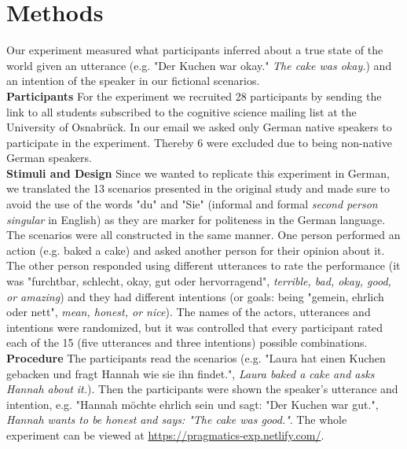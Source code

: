 \documentclass[a4paper,11pt]{article}
\begin{document}
\section{Methods}
Our experiment measured what participants inferred about a true state of the world given an utterance (e.g. "Der Kuchen war okay." \textit{The cake was okay.}) and an intention of the speaker in our fictional scenarios. \\
\textbf{Participants} For the experiment we recruited 28 participants by sending the link to all students subscribed to the cognitive science mailing list at the University of Osnabrück. In our email we asked only German native speakers to participate in the experiment. Thereby 6 were excluded due to being non-native German speakers.\\
\textbf{Stimuli and Design} Since we wanted to replicate this experiment in German, we translated the 13 scenarios presented in the original study and made sure to avoid the use of the words "du" and "Sie" (informal and formal \textit{second person singular} in English) as they are marker for politeness in the German language. The scenarios were all constructed in the same manner. One person performed an action (e.g. baked a cake) and asked another person for their opinion about it. The other person responded using different utterances to rate the performance (it was "furchtbar, schlecht, okay, gut oder hervorragend", \textit{terrible, bad, okay, good, or amazing}) and they had different intentions (or goals: being "gemein, ehrlich oder nett", \textit{mean, honest, or nice}). The names of the actors, utterances and intentions were randomized, but it was controlled that every participant rated each of the 15 (five utterances and three intentions) possible combinations.\\
\textbf{Procedure} The participants read the scenarios (e.g. "Laura hat einen Kuchen gebacken und fragt Hannah wie sie ihn findet.", \textit{Laura baked a cake and asks Hannah about it.}). Then the participants were shown the speaker's utterance and intention, e.g. "Hannah möchte ehrlich sein und sagt: "Der Kuchen war gut.", \textit{Hannah wants to be honest and says: "The cake was good."}. The whole experiment can be viewed at \url{https://pragmatics-exp.netlify.com/}. 
\end{document}
